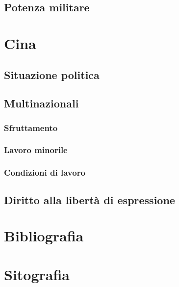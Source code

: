 \documentclass[a4paper, 12pt]{article}
\begin{document}
\subsection{Potenza militare}

\section{Cina}

\subsection{Situazione politica}

\subsection{Multinazionali}

\subsubsection{Sfruttamento}

\subsubsection{Lavoro minorile}

\subsubsection{Condizioni di lavoro}

\subsection{Diritto alla libertà di espressione}

\section{Bibliografia}

\section{Sitografia}

\nocite{*}
\printbibliography[type=online, heading=subbibliography] 	
\end{document}
